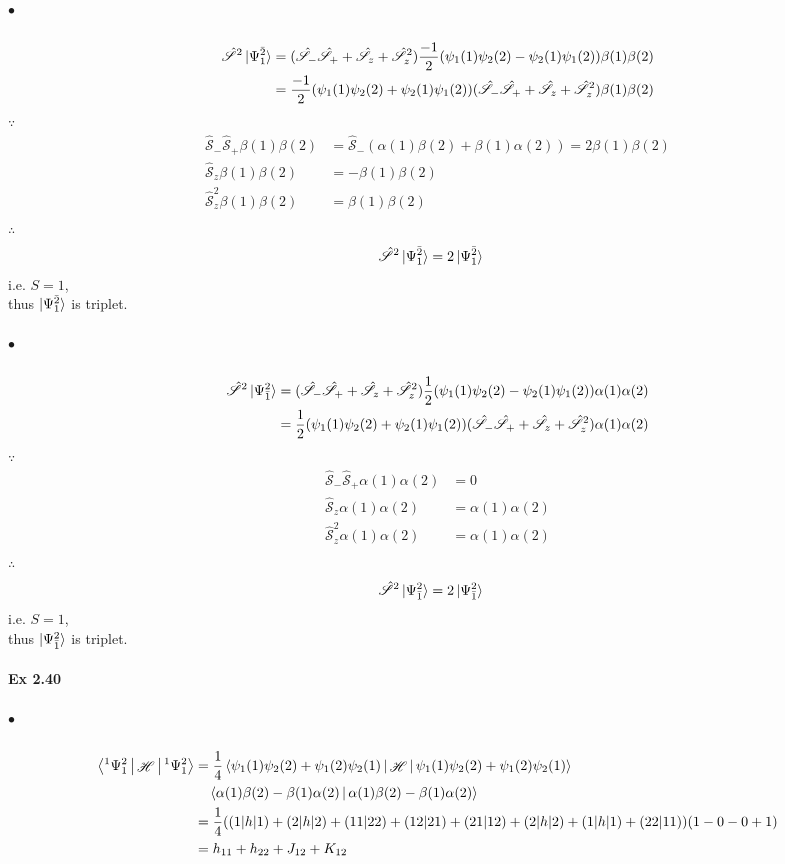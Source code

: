 \documentclass[a4paper]{article}
\DeclareMathOperator{\sH}{\mathscr{H}}
\newcommand{\hsS}{\hat{\mathscr{S}}}
\newcommand{\ex}[1]{\paragraph{Ex #1}}
\newcommand{\subex}[1]{\subparagraph{#1}}
\numberwithin{equation}{subsection}
\begin{document}
\subex{$ \bullet $}
\begin{align}
\hsS^2\ket{\Psi_1^{\bar{2}}} &= (\hsS_-\hsS_+ + \hsS_z + \hsS_z^2)\dfrac{-1}{2}(\psi_1(1)\psi_2(2) - \psi_2(1)\psi_1(2))\beta(1)\beta(2) \notag\\
&= \dfrac{-1}{2}(\psi_1(1)\psi_2(2) + \psi_2(1)\psi_1(2))(\hsS_-\hsS_+ + \hsS_z + \hsS_z^2)\beta(1)\beta(2)
\end{align}
$ \because $
\begin{align}
\hsS_-\hsS_+ \beta(1)\beta(2) &= \hsS_-(\alpha(1)\beta(2) + \beta(1)\alpha(2)) = 2\beta(1)\beta(2) \\
\hsS_z \beta(1)\beta(2) &= -\beta(1)\beta(2)\\
\hsS_z^2 \beta(1)\beta(2) &= \beta(1)\beta(2)\\
\end{align}
$ \therefore $
\begin{align}
\hsS^2\ket{\Psi_1^{\bar{2}}} &= 2\ket{\Psi_1^{\bar{2}}}
\end{align}
i.e. $ S=1 $,\\
thus $ \ket{\Psi_1^{\bar{2}}} $ is triplet.

\subex{$ \bullet $}
\begin{align}
\hsS^2\ket{\Psi_{\bar{1}}^2} &= (\hsS_-\hsS_+ + \hsS_z + \hsS_z^2)\dfrac{1}{2}(\psi_1(1)\psi_2(2) - \psi_2(1)\psi_1(2))\alpha(1)\alpha(2) \notag\\
&= \dfrac{1}{2}(\psi_1(1)\psi_2(2) + \psi_2(1)\psi_1(2))(\hsS_-\hsS_+ + \hsS_z + \hsS_z^2)\alpha(1)\alpha(2)
\end{align}
$ \because $
\begin{align}
\hsS_-\hsS_+ \alpha(1)\alpha(2) &= 0 \\
\hsS_z \alpha(1)\alpha(2) &= \alpha(1)\alpha(2)\\
\hsS_z^2 \alpha(1)\alpha(2) &= \alpha(1)\alpha(2)\\
\end{align}
$ \therefore $
\begin{align}
\hsS^2\ket{\Psi_{\bar{1}}^2} &= 2\ket{\Psi_{\bar{1}}^2}
\end{align}
i.e. $ S=1 $,\\
thus $ \ket{\Psi_{\bar{1}}^2} $ is triplet.

\ex{2.40}
\subex{$ \bullet $}
\begin{align}
\Braket{^1\Psi_1^2 | \sH | ^1\Psi_1^2} &= \dfrac{1}{4} \Braket{\psi_1(1)\psi_2(2) + \psi_1(2)\psi_2(1) | \sH | \psi_1(1)\psi_2(2) + \psi_1(2)\psi_2(1)} \notag\\
  &\quad{} \Braket{\alpha(1)\beta(2) - \beta(1)\alpha(2) | \alpha(1)\beta(2) - \beta(1)\alpha(2)}\notag\\
&= \dfrac{1}{4}((1|h|1) + (2|h|2) + (11|22) + (12|21) + (21|12) + (2|h|2) + (1|h|1) + (22|11) ) (1 - 0 - 0 + 1) \notag\\
&= h_{11} + h_{22} + J_{12} + K_{12}
\end{align}
\end{document}
